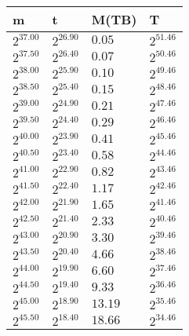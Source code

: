 \begin{tabular}{llll}
m & t & M(TB) & T \\ \hline
$2^{37.00}$ & $2^{26.90}$ & $0.05$ & $2^{51.46}$ \\
$2^{37.50}$ & $2^{26.40}$ & $0.07$ & $2^{50.46}$ \\
$2^{38.00}$ & $2^{25.90}$ & $0.10$ & $2^{49.46}$ \\
$2^{38.50}$ & $2^{25.40}$ & $0.15$ & $2^{48.46}$ \\
$2^{39.00}$ & $2^{24.90}$ & $0.21$ & $2^{47.46}$ \\
$2^{39.50}$ & $2^{24.40}$ & $0.29$ & $2^{46.46}$ \\
$2^{40.00}$ & $2^{23.90}$ & $0.41$ & $2^{45.46}$ \\
$2^{40.50}$ & $2^{23.40}$ & $0.58$ & $2^{44.46}$ \\
$2^{41.00}$ & $2^{22.90}$ & $0.82$ & $2^{43.46}$ \\
$2^{41.50}$ & $2^{22.40}$ & $1.17$ & $2^{42.46}$ \\
$2^{42.00}$ & $2^{21.90}$ & $1.65$ & $2^{41.46}$ \\
$2^{42.50}$ & $2^{21.40}$ & $2.33$ & $2^{40.46}$ \\
$2^{43.00}$ & $2^{20.90}$ & $3.30$ & $2^{39.46}$ \\
$2^{43.50}$ & $2^{20.40}$ & $4.66$ & $2^{38.46}$ \\
$2^{44.00}$ & $2^{19.90}$ & $6.60$ & $2^{37.46}$ \\
$2^{44.50}$ & $2^{19.40}$ & $9.33$ & $2^{36.46}$ \\
$2^{45.00}$ & $2^{18.90}$ & $13.19$ & $2^{35.46}$ \\
$2^{45.50}$ & $2^{18.40}$ & $18.66$ & $2^{34.46}$ \\
\end{tabular}


